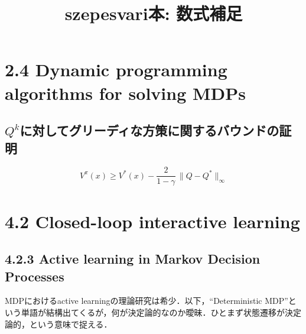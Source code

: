 \documentclass{jsarticle}
\date{}
\title{szepesvari本: 数式補足}
\newcommand{\st}{x}
\begin{document}
\maketitle

\section*{2.4 Dynamic programming algorithms for solving MDPs}

\subsection*{$Q^{k}$に対してグリーディな方策に関するバウンドの証明}
\begin{equation}
V^\pi(\st) \ge V^*(\st) - \frac{2}{1-\gamma} \, \|Q-Q^*\|_{\infty}
\end{equation}

\section*{4.2 Closed-loop interactive learning}
\subsection*{4.2.3 Active learning in Markov Decision Processes}
MDPにおけるactive learningの理論研究は希少．以下，``Deterministic MDP''という単語が結構出てくるが，何が決定論的なのか曖昧．ひとまず状態遷移が決定論的，という意味で捉える．
\end{document}
